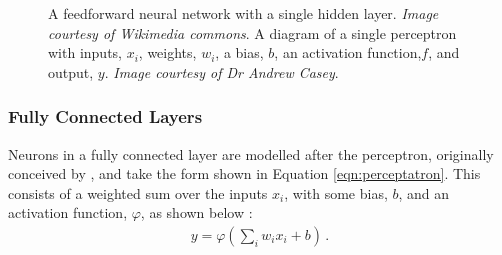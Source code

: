 \documentclass[11pt,a4paper,onecolumn]{report}
\begin{document}
  \begin{figure}[t]%
    \centering
    \qquad
    \caption[]{  A feedforward neural network with a single hidden layer.
      \textit{Image courtesy of Wikimedia commons\protect\footnotemark}.
       A diagram of a single perceptron with inputs,
      \(x_i\), weights, \(w_i\), a bias, \(b\), an activation function,\(f\),
      and output, \(y\). \textit{Image courtesy of Dr Andrew Casey}.}
  \end{figure}




\subsubsection{Fully Connected Layers}
Neurons in a fully connected layer are modelled after the perceptron, originally
conceived by \citet{rosenblatt1958}, and take the form shown in Equation
\ref{eqn:perceptatron}. This consists of a weighted sum over the inputs $x_i$,
with some bias, $b$, and an activation function, $\varphi$, as shown below
\citep{reagen2017}:
\begin{align}
  \label{eqn:perceptatron}
  y = \varphi \left(\sum_{i}{w_i x_i} + b \right)\,.
\end{align}
\\
\end{document}
